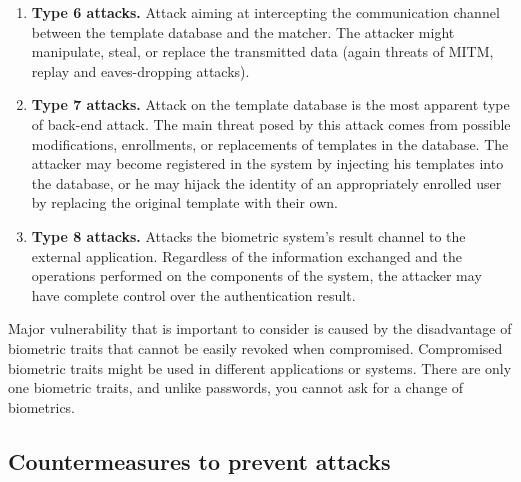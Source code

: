 \begin{enumerate}
    \item \textbf{Type 6 attacks.} Attack aiming at intercepting the communication channel between the template database and the matcher. The attacker might manipulate, steal, or replace the transmitted data (again threats of MITM, replay and eaves-dropping attacks). 
    \item \textbf{Type 7 attacks.} Attack on the template database is the most apparent type of back-end attack. The main threat posed by this attack comes from possible modifications, enrollments, or replacements of templates in the database. The attacker may become registered in the system by injecting his templates into the database, or he may hijack the identity of an appropriately enrolled user by replacing the original template with their own.
    \item \textbf{Type 8 attacks.} Attacks the biometric system's result channel to the external application. Regardless of the information exchanged and the operations performed on the components of the system, the attacker may have complete control over the authentication result.
\end{enumerate}

\noindent Major vulnerability that is important to consider is caused by the disadvantage of biometric traits that cannot be easily revoked when compromised. Compromised biometric traits might be used in different applications or systems. There are only one biometric traits, and unlike passwords, you cannot ask for a change of biometrics. 

\subsection{Countermeasures to prevent attacks}
\label{Countermeasures to prevent attacks}


